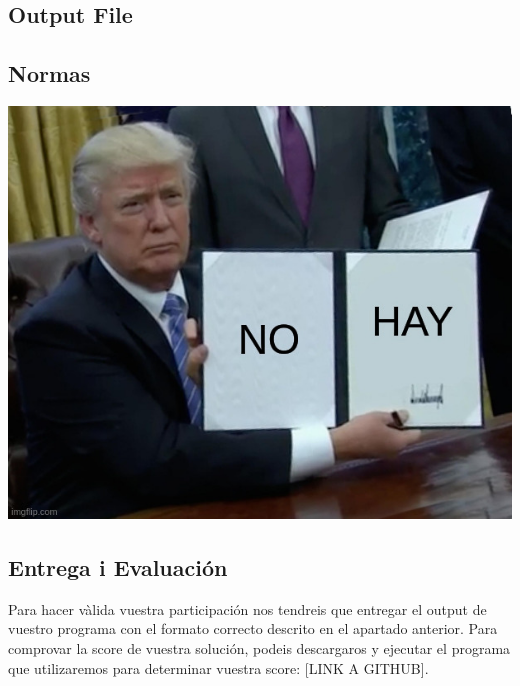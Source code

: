 \documentclass{article}
\begin{document}
\subsection{Output File}


\subsection{Normas}
\includegraphics[width=\linewidth]{meme.jpg}

\subsection{Entrega i Evaluación}
Para hacer vàlida vuestra participación nos tendreis que entregar el output de vuestro programa con el formato correcto descrito en el apartado anterior. Para comprovar la score de vuestra solución, podeis descargaros y ejecutar el programa que utilizaremos para determinar vuestra score: [LINK A GITHUB]. 
\end{document}
